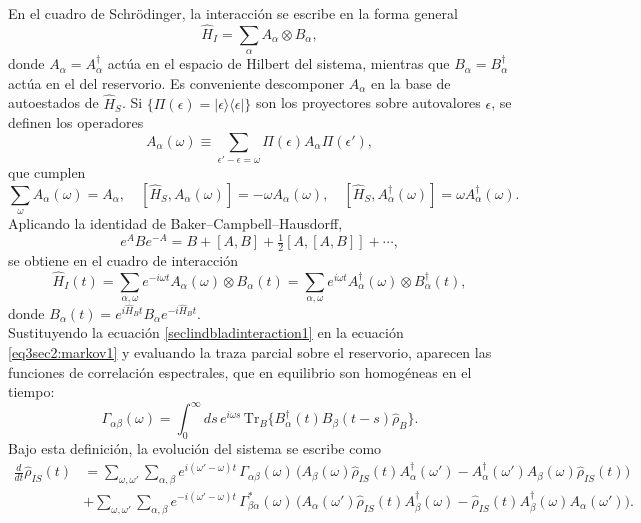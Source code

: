 En el cuadro de Schrödinger, la interacción se escribe en la forma general
\begin{equation*}
    \hat{H}_{I} = \sum_{\alpha} A_{\alpha} \otimes B_{\alpha},
\end{equation*}
donde $A_{\alpha}=A_{\alpha}^{\dagger}$ actúa en el espacio de Hilbert del sistema, mientras que $B_{\alpha}=B_{\alpha}^{\dagger}$ actúa en el del reservorio. Es conveniente descomponer $A_{\alpha}$ en la base de autoestados de $\hat{H}_{S}$. Si $\{\Pi(\epsilon)=|\epsilon\rangle\langle\epsilon|\}$ son los proyectores sobre autovalores $\epsilon$, se definen los operadores
\begin{equation}
    A_{\alpha}(\omega) \equiv \sum_{\epsilon'-\epsilon=\omega} \Pi(\epsilon)A_{\alpha}\Pi(\epsilon'),
    \label{sec1:globalA}
\end{equation}
que cumplen
\[
\sum_{\omega} A_{\alpha}(\omega) = A_{\alpha}, \quad
[\hat{H}_{S}, A_{\alpha}(\omega)] = -\omega A_{\alpha}(\omega), \quad
[\hat{H}_{S}, A_{\alpha}^{\dagger}(\omega)] = \omega A_{\alpha}^{\dagger}(\omega).
\]
Aplicando la identidad de Baker--Campbell--Hausdorff,
\begin{equation}
    e^{A}Be^{-A} = B + [A,B] + \tfrac{1}{2}[A,[A,B]] + \cdots,
    \label{sec2lind:baker}
\end{equation}
se obtiene en el cuadro de interacción
\begin{equation}
    \hat{H}_{I}(t) = \sum_{\alpha,\omega} e^{-i\omega t} A_{\alpha}(\omega) \otimes B_{\alpha}(t)
    = \sum_{\alpha,\omega} e^{i\omega t} A_{\alpha}^{\dagger}(\omega) \otimes B_{\alpha}^{\dagger}(t),
    \label{seclindbladinteraction1}
\end{equation}
donde $B_{\alpha}(t)=e^{i\hat{H}_{B}t}B_{\alpha}e^{-i\hat{H}_{B}t}$.
\\

Sustituyendo la ecuación \eqref{seclindbladinteraction1} en la ecuación \eqref{eq3sec2:markov1} y evaluando la traza parcial sobre el reservorio, aparecen las funciones de correlación espectrales, que en equilibrio son homogéneas en el tiempo:
\begin{equation*}
    \Gamma_{\alpha\beta}(\omega) = \int_{0}^{\infty} ds \, e^{i\omega s}\, 
    \text{Tr}_{B}\{B_{\alpha}^{\dagger}(t)B_{\beta}(t-s)\hat{\rho}_{B}\}.
\end{equation*}
Bajo esta definición, la evolución del sistema se escribe como
\begin{align*}
    \frac{d}{dt}\hat{\rho}_{IS}(t) &=
    \sum_{\omega,\omega'}\sum_{\alpha,\beta} e^{i(\omega'-\omega)t}\, \Gamma_{\alpha\beta}(\omega)\,
    \Big(A_{\beta}(\omega)\hat{\rho}_{IS}(t)A_{\alpha}^{\dagger}(\omega')
        - A_{\alpha}^{\dagger}(\omega')A_{\beta}(\omega)\hat{\rho}_{IS}(t)\Big) \\
    &+ \sum_{\omega,\omega'}\sum_{\alpha,\beta} e^{-i(\omega'-\omega)t}\, \Gamma^{*}_{\beta\alpha}(\omega)\,
    \Big(A_{\alpha}(\omega')\hat{\rho}_{IS}(t)A_{\beta}^{\dagger}(\omega)
        - \hat{\rho}_{IS}(t)A_{\beta}^{\dagger}(\omega)A_{\alpha}(\omega')\Big).
\end{align*}

